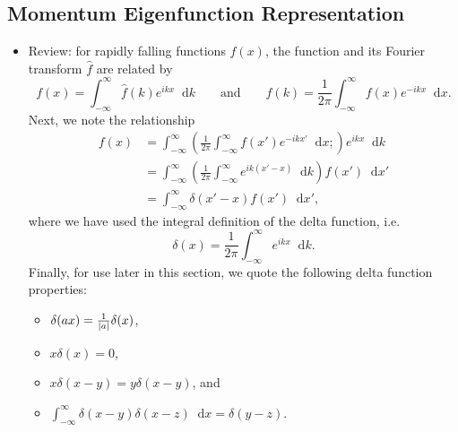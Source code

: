\documentclass[11pt, a4paper]{article}
\newcommand{\diff}{\mathop{}\!\mathrm{d}} %
\newcommand{\F}[1]{\widehat{#1}} %
\begin{document}
\subsection{Momentum Eigenfunction Representation} 

\begin{itemize}
    \item Review: for rapidly falling functions $ f(x) $, the function and its Fourier transform $ \F{f} $ are related by
    \begin{equation*}
        f(x) = \int_{-\infty}^{\infty} \F{f}(k)e^{ikx}\diff k \qquad \text{and} \qquad \F{f}(k) = \frac{1}{2\pi}\int_{-\infty}^{\infty}f(x)e^{-ikx}\diff x.
    \end{equation*}
    Next, we note the relationship
    \begin{align*}
        f(x) &= \int_{-\infty}^{\infty}\left( \frac{1}{2\pi} \int_{-\infty}^{\infty}f(x')e^{-ikx'}\diff x; \right)e^{ikx}\diff k \\
        &= \int_{-\infty}^{\infty}\left( \frac{1}{2\pi}\int_{-\infty}^{\infty}e^{ik(x'-x)}\diff k \right) f(x')\diff x'\\
        & = \int_{-\infty}^{\infty}\delta(x' - x)f(x')\diff x',
    \end{align*}
    where we have used the integral definition of the delta function, i.e.
    \begin{equation*}
        \delta(x) = \frac{1}{2\pi}\int_{-\infty}^{\infty}e^{ikx}\diff k.
    \end{equation*}
    Finally, for use later in this section, we quote the following delta function properties:
    \begin{itemize}
        \item $ \delta(ax) = \frac{1}{\abs{a}} \delta(x) $,
        \item $ x\delta(x) = 0 $,
        \item $ x \delta(x - y) = y \delta(x - y) $, \quad and
        \item $ \int_{-\infty}^{\infty}\delta(x - y)\delta(x - z)\diff x  = \delta(y - z)$.
    \end{itemize}
    
\end{itemize}
\end{document}
